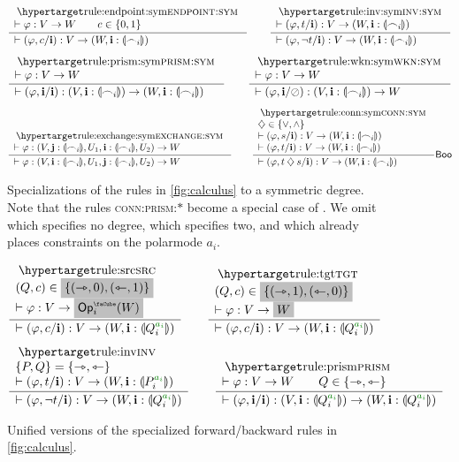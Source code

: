 \documentclass[a4paper]{memoir}
\begin{document}
\begin{figure}[htb]
	\[
		\inferencel{endpoint:sym}{
			\sez \vfi : V \to W
			\qquad
			c \in \accol{0, 1}
		}{
			\sez (\vfi, c/\dm i) : V \to (W, \dm i : \rival{\edge_i})
		}{}
		\qquad
		\inferencel{inv:sym}{
			\sez (\vfi, t/\dm i) : V \to (W, \dm i : \rival{\edge_i})
		}{
			\sez (\vfi, \lnot t/\dm i) : V \to (W, \dm i : \rival{\edge_i})
		}{}
	\]
	\[
		\inferencel{prism:sym}{
			\sez \vfi : V \to W
		}{
			\sez (\vfi, \dm i / \dm i) : (V, \dm i : \rival{\edge_i}) \to (W, \dm i : \rival{\edge_i})
		}{}
		\qquad
		\inferencel{wkn:sym}{
			\sez \vfi : V \to W
		}{
			\sez (\vfi, \dm i / \novar) : (V, \dm i : \rival{\edge_i}) \to W
		}{}
	\]
	\[
		\inferencel{exchange:sym}{
			\sez \vfi : (V, \dm j : \rival{\edge_i}, U_1, \dm i : \rival{\edge_i}, U_2) \to W
		}{
			\sez \vfi : (V, \dm i : \rival{\edge_i}, U_1, \dm j : \rival{\edge_i}, U_2) \to W
		}{}
		\qquad
		\inferencel{conn:sym}{
			\opA \in \accol{{\vee}, {\wedge}} \\
			\sez (\vfi, s / \dm i) : V \to (W, \dm i : \rival{\edge_i}) \\
			\sez (\vfi, t / \dm i) : V \to (W, \dm i : \rival{\edge_i})
		}{
			\sez (\vfi, t \opA s / \dm i) : V \to (W, \dm i : \rival{\edge_i})
		}{$\booleanalg$}
	\]
	\caption{Specializations of the rules in \cref{fig:calculus} to a symmetric degree. Note that the rules \textsc{conn:prism:}$*$ become a special case of . We omit  which specifies no degree,  which specifies two, and  which already places constraints on the polarmode $a_i$.}
	\label{fig:calculus:sym}
\end{figure}
\begin{figure}[htb]
	\[
		\inferencel{src}{
			(Q, c) \in \mathemph{\accol{(\jet, 0), (\tej, 1)}} \\
			\sez \vfi : V \to \mathemph{\Opcube_i(W)}
		}{
			\sez (\vfi, c/\dm i) : V \to (W, \dm i : \rival{Q_i\pmr{a_i}})
		}{}
		\qquad
		\inferencel{tgt}{
			(Q, c) \in \mathemph{\accol{(\jet, 1), (\tej, 0)}} \\
			\sez \vfi : V \to \mathemph{W}
		}{
			\sez (\vfi, c/\dm i) : V \to (W, \dm i : \rival{Q_i\pmr{a_i}})
		}{}
	\]
	\[
		\inferencel{inv}{
			\accol{P, Q} = \accol{\jet, \tej} \\
			\sez (\vfi, t/\dm i) : V \to (W, \dm i : \rival{P_i\pmr{a_i}})
		}{
			\sez (\vfi, \lnot t/\dm i) : V \to (W, \dm i : \rival{Q_i\pmr{a_i}})
		}{}
		\qquad
		\inferencel{prism}{
			\sez \vfi : V \to W
			\qquad
			Q \in \accol{\jet, \tej}
		}{
			\sez (\vfi, \dm i / \dm i) : (V, \dm i : \rival{Q_i\pmr{a_i}}) \to (W, \dm i : \rival{Q_i\pmr{a_i}})
		}{}
	\]
	\caption{Unified versions of the specialized forward/backward rules in \cref{fig:calculus}.}
	\label{fig:calculus:general}
\end{figure}
\end{document}
